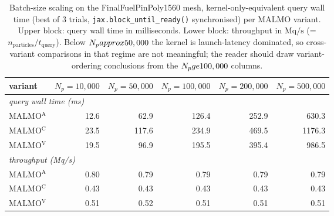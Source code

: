 \begin{table}[t]
\centering\small
\caption{Batch-size scaling on the FinalFuelPinPoly1560 mesh, kernel-only-equivalent query wall time (best of 3 trials, \texttt{jax.block\_until\_ready()} synchronised) per MALMO variant.  Upper block: query wall time in milliseconds.  Lower block: throughput in $\text{Mq}/\text{s}$ (= $n_\text{particles}/t_\text{query}$).  Below $N_p \\approx 50\\,000$ the kernel is launch-latency dominated, so cross-variant comparisons in that regime are not meaningful; the reader should draw variant-ordering conclusions from the $N_p \\ge 100\\,000$ columns.}
\label{tab:r27-batch-FinalFuelPinPoly1560}
\begin{tabular}{lrrrrr}
\toprule
variant & $N_p{=}10{,}000$ & $N_p{=}50{,}000$ & $N_p{=}100{,}000$ & $N_p{=}200{,}000$ & $N_p{=}500{,}000$ \\
\midrule
\multicolumn{6}{l}{\emph{query wall time (ms)}} \\
MALMO$^{\mathrm{A}}$ & 12.6 & 62.9 & 126.4 & 252.9 & 630.3 \\
MALMO$^{\mathrm{C}}$ & 23.5 & 117.6 & 234.9 & 469.5 & 1176.3 \\
MALMO$^{\mathrm{V}}$ & 19.5 & 96.9 & 195.5 & 395.4 & 986.5 \\
\midrule
\multicolumn{6}{l}{\emph{throughput (Mq/s)}} \\
MALMO$^{\mathrm{A}}$ & 0.80 & 0.79 & 0.79 & 0.79 & 0.79 \\
MALMO$^{\mathrm{C}}$ & 0.43 & 0.43 & 0.43 & 0.43 & 0.43 \\
MALMO$^{\mathrm{V}}$ & 0.51 & 0.52 & 0.51 & 0.51 & 0.51 \\
\bottomrule
\end{tabular}
\end{table}
